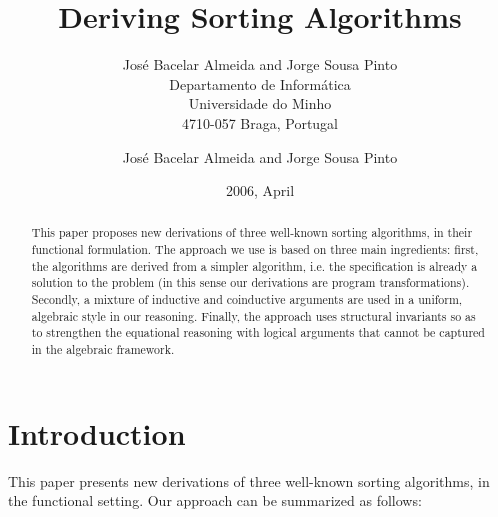 \documentclass[a4paper,11pt]{llncs}
\title{\titulo}
\author{Jos\'e Bacelar Almeida and Jorge Sousa Pinto\\
Departamento de Inform\'atica\\ 
Universidade do Minho\\
4710-057 Braga, Portugal\\
\email{\{jba,jsp\}@di.uminho.pt}
}
\def\titulo{Deriving Sorting Algorithms}
\def\data{2006, April}
\begin{document}
\purecover



 

\title{\titulo}

\author{Jos\'e Bacelar Almeida and Jorge Sousa Pinto\\
}
\date{\data}


\maketitle 

\begin{abstract}
This paper proposes new derivations of three well-known sorting
algorithms, in their functional formulation. The approach we use is
based on three main ingredients: first, the algorithms are derived
from a simpler algorithm, i.e.  the specification is already a
solution to the problem (in this sense our derivations are program
transformations). Secondly, a mixture of inductive and coinductive
arguments are used in a uniform, algebraic style in our
reasoning. Finally, the approach uses structural invariants so as to
strengthen the equational reasoning with logical arguments that cannot
be captured in the algebraic framework.
\end{abstract}







\section{Introduction}

This paper presents new derivations of three well-known sorting
algorithms, in the functional setting. 
Our approach can be summarized as follows:
\end{document}
